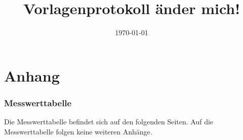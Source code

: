 

\title{Vorlagenprotokoll \texorpdfstring{{\color{red} änder mich!}}{Änder mich}}

\date{\today}

\submissiondate{\today}

\usepackage[math]{blindtext}


\maketitle

\doublespacing


\newpage

\newpage

\singlespacing
\part{Anhang}
\blindtext
\printbibliography[heading=bibnumbered,title=Referenzen und Literatur]
\newpage

\section{Messwerttabelle}
Die Messwerttabelle befindet sich auf den folgenden Seiten.
Auf die Messwerttabelle folgen keine weiteren Anhänge.

% 


